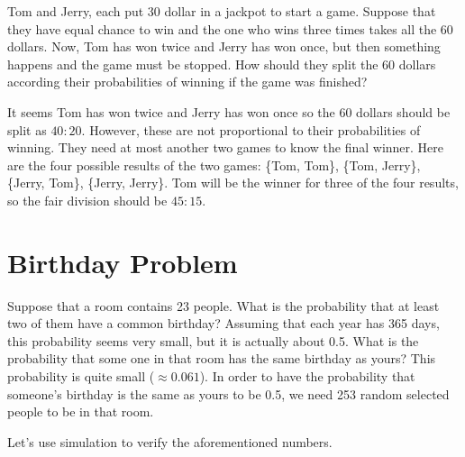 Tom and Jerry, each put 30 dollar in a jackpot to start a game. Suppose that
they have equal chance to win and the one who wins three times takes all the 60
dollars. Now, Tom has won twice and Jerry has won once, but then something
happens and the game must be stopped. How should they split the 60 dollars
according their probabilities of winning if the game was finished?

It seems Tom has won twice and Jerry has won once so the 60 dollars should be
split as $40:20$. However, these are not proportional to their probabilities of
winning. They need at most another two games to know the final winner. Here are
the four possible results of the two games: \{Tom, Tom\}, \{Tom, Jerry\},
\{Jerry, Tom\}, \{Jerry, Jerry\}. Tom will be the winner for three of the four
results, so the fair division should be $45:15$.

\hypertarget{birthday-problem}{%
  \section{Birthday Problem}\label{birthday-problem}}

\begin{example}
Suppose that a room contains 23 people. What is the probability that
at least two of them have a common birthday? Assuming that each year has 365
days, this probability seems very small, but it is actually about
0.5. What is the probability that some one in that room has the same
birthday as yours? This probability is quite small
($\approx0.061$). In order to have the probability that someone's
birthday is the same as yours to be 0.5, we need 253 random selected people to
be in that room.
\end{example}

Let's use simulation to verify the aforementioned numbers.




